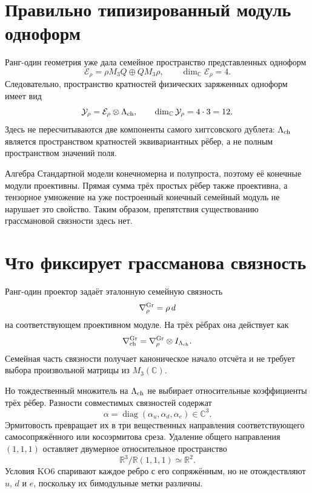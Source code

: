 \section{Правильно типизированный модуль одноформ}

Ранг-один геометрия уже дала семейное пространство представленных одноформ
\begin{equation}
 \mathcal E_\rho=\rho M_3Q\oplus QM_3\rho,
 \qquad \dim_{\mathbb C}\mathcal E_\rho=4.
\end{equation}
Следовательно, пространство кратностей физических заряженных одноформ
имеет вид
\begin{equation}
 \mathcal Y_\rho=\mathcal E_\rho\otimes\Lambda_{\rm ch},
 \qquad \dim_{\mathbb C}\mathcal Y_\rho=4\cdot3=12.
 \label{eq:v5-h15-physical-oneforms}
\end{equation}
Здесь не пересчитываются две компоненты самого хиггсовского дублета:
$\Lambda_{\rm ch}$ является пространством кратностей эквивариантных
рёбер, а не полным пространством значений поля.

Алгебра Стандартной модели конечномерна и полупроста, поэтому её конечные
модули проективны. Прямая сумма трёх простых рёбер также проективна, а
тензорное умножение на уже построенный конечный семейный модуль не нарушает
это свойство. Таким образом, препятствия существованию грассмановой
связности здесь нет.

\section{Что фиксирует грассманова связность}

Ранг-один проектор задаёт эталонную семейную связность
\begin{equation}
 \nabla_\rho^{\rm Gr}=\rho\,d
\end{equation}
на соответствующем проективном модуле. На трёх рёбрах она действует как
\begin{equation}
 \nabla_{\rm ch}^{\rm Gr}=\nabla_\rho^{\rm Gr}\otimes I_{\Lambda_{\rm ch}}.
\end{equation}
Семейная часть связности получает каноническое начало отсчёта и не требует
выбора произвольной матрицы из $M_3(\mathbb C)$.

Но тождественный множитель на $\Lambda_{\rm ch}$ не выбирает относительные
коэффициенты трёх рёбер. Разности совместимых связностей содержат
\begin{equation}
 \alpha=\operatorname{diag}(\alpha_u,\alpha_d,\alpha_e)\in\mathbb C^3.
\end{equation}
Эрмитовость превращает их в три вещественных направления соответствующего
самосопряжённого или косоэрмитова среза. Удаление общего направления
$(1,1,1)$ оставляет двумерное относительное пространство
\begin{equation}
 \mathbb R^3/\mathbb R(1,1,1)\simeq\mathbb R^2.
 \label{eq:v5-h15-relative-connection-plane}
\end{equation}
Условия KO6 спаривают каждое ребро с его сопряжённым, но не отождествляют
$u$, $d$ и $e$, поскольку их бимодульные метки различны.

